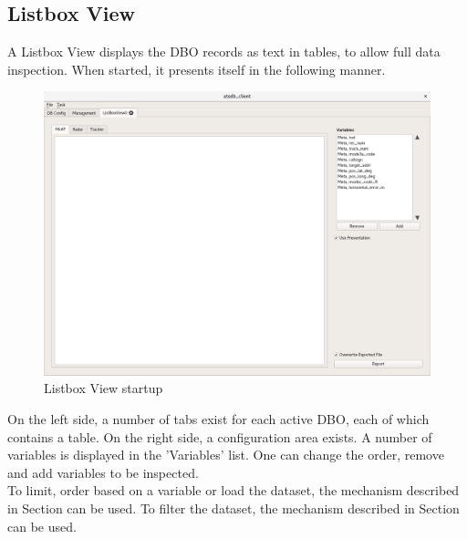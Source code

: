 \subsection{Listbox View}
\label{sec:listbox_view}
A Listbox View displays the DBO records as text in tables, to allow full data inspection. When started, it presents itself in the following manner.

\begin{figure}[H]
    \hspace*{-2cm}
    \includegraphics[width=18cm,frame]{../screenshots/listbox_start.png}
  \caption{Listbox View startup}
  \label{fig:listbox_start}
\end{figure}

On the left side, a number of tabs exist for each active DBO, each of which contains a table. On the right side, a configuration area exists. A number of variables is displayed in the 'Variables' list. One can change the order, remove and add variables to be inspected. \\

To limit, order based on a variable or load the dataset, the mechanism described in Section  can be used. To filter the dataset, the mechanism described in Section  can be used.

